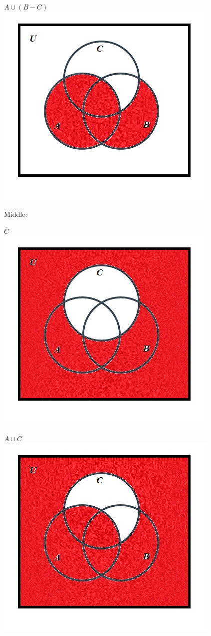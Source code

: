 \documentclass[10pt]{article}
\begin{document}
$A \cup (B - C)$\\
\includegraphics[scale=0.55]{30}

Middle:

$\overline{C}$\\
\includegraphics[scale=0.55]{19}

$A \cup \overline{C}$\\
\includegraphics[scale=0.55]{31}
\end{document}

